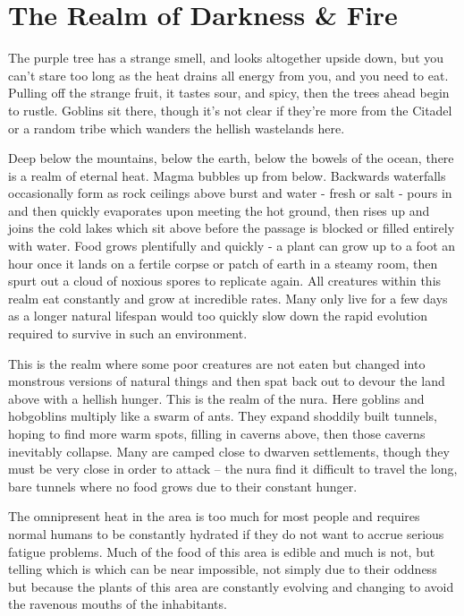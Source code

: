 \section{The Realm of Darkness \& Fire}\label{darknessandfire}

\begin{multicols}{2}

\begin{boxtext}

	The purple tree has a strange smell, and looks altogether upside down, but you can't stare too long as the heat drains all energy from you, and you need to eat.
Pulling off the strange fruit, it tastes sour, and spicy, then the trees ahead begin to rustle.
Goblins sit there, though it's not clear if they're more from the Citadel or a random tribe which wanders the hellish wastelands here.

\end{boxtext}

Deep below the mountains, below the earth, below the bowels of the ocean, there is a realm of eternal heat.  Magma bubbles up from below.  Backwards waterfalls occasionally form as rock ceilings above burst and water - fresh or salt - pours in and then quickly evaporates upon meeting the hot ground, then rises up and joins the cold lakes which sit above before the passage is blocked or filled entirely with water.  Food grows plentifully and quickly - a plant can grow up to a foot an hour once it lands on a fertile corpse or patch of earth in a steamy room, then spurt out a cloud of noxious spores to replicate again.  All creatures within this realm eat constantly and grow at incredible rates.  Many only live for a few days as a longer natural lifespan would too quickly slow down the rapid evolution required to survive in such an environment.

	This is the realm where some poor creatures are not eaten but changed into monstrous versions of natural things and then spat back out to devour the land above with a hellish hunger.  This is the realm of the nura.  Here goblins and hobgoblins multiply like a swarm of ants.  They expand shoddily built tunnels, hoping to find more warm spots, filling in caverns above, then those caverns inevitably collapse.  Many are camped close to dwarven settlements, though they must be very close in order to attack -- the nura find it difficult to travel the long, bare tunnels where no food grows due to their constant hunger.

	The omnipresent heat in the area is too much for most people and requires normal humans to be constantly hydrated if they do not want to accrue serious fatigue problems.  Much of the food of this area is edible and much is not, but telling which is which can be near impossible, not simply due to their oddness but because the plants of this area are constantly evolving and changing to avoid the ravenous mouths of the inhabitants.


\end{multicols}
